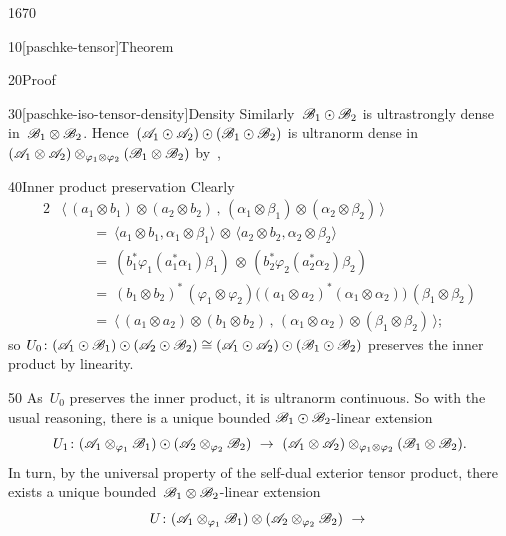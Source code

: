 \begin{parsec}{1670}
\begin{point}{10}[paschke-tensor]{Theorem}
\begin{point}{20}{Proof}
\begin{point}{30}[paschke-iso-tensor-density]{Density}
Similarly~$\mathscr{B}_1 \odot \mathscr{B}_2$
    is ultrastrongly dense in~$\mathscr{B}_1 \otimes \mathscr{B}_2$.
Hence~$(\mathscr{A}_1 \odot \mathscr{A}_2) \odot 
    (\mathscr{B}_1 \odot \mathscr{B}_2)$ is ultranorm dense
    in
    $(\mathscr{A}_1 \otimes \mathscr{A}_2) \otimes_{\varphi_1 \otimes \varphi_2}
    (\mathscr{B}_1 \otimes \mathscr{B}_2)$
        by~,
\end{point}
\begin{point}{40}{Inner product preservation}%
Clearly
\begin{alignat*}{2}
    &
    \bigl\langle\,
    (a_1 \otimes b_1)\otimes (a_2 \otimes b_2)\,,\,
    (\alpha_1 \otimes \beta_1 )\otimes( \alpha_2 \otimes \beta_2)
    \,\bigr\rangle \\
    & \qquad\ = \ 
    \langle a_1 \otimes b_1 , \alpha_1 \otimes \beta_1 \rangle \,\otimes\,
    \langle a_2 \otimes b_2 , \alpha_2 \otimes \beta_2 \rangle \\
    & \qquad\ = \ 
    (b_1^* \varphi_1( a_1^* \alpha_1) \beta_1)
    \,\otimes \,
    (b_2^* \varphi_2( a_2^* \alpha_2) \beta_2) \\
    & \qquad \ = \ 
    (b_1 \otimes b_2)^* \,(\varphi_1 \otimes \varphi_2)
    \bigl((a_1 \otimes a_2)^* (\alpha_1 \otimes \alpha_2)\bigr)
    \,(\beta_1 \otimes \beta_2) \\
    & \qquad \ = \ 
    \bigl\langle\,
    (a_1\otimes a_2)\otimes (b_1 \otimes b_2) \,,\,
    (\alpha_1\otimes \alpha_2)\otimes (\beta_1 \otimes \beta_2)
    \,\bigr\rangle;
\end{alignat*}
so $U_0 \colon (\mathscr{A}_1 \odot \mathscr{B}_1) \odot (\mathscr{A}_2 \odot \mathscr{B}_2) \cong
(\mathscr{A}_1 \odot \mathscr{A}_2) \odot (\mathscr{B}_1 \odot \mathscr{B}_2) $
preserves the inner product by linearity.
\end{point}
\begin{point}{50}%
As~$U_0$ preserves the inner product,
    it is ultranorm continuous.
So with the usual reasoning, there is a unique bounded
    $\mathscr{B}_1 \odot \mathscr{B}_2$-linear extension
\begin{equation*}
    U_1\colon (\scrA_1 \otimes_{\varphi_1} \scrB_1) \odot (\scrA_2 \otimes_{\varphi_2} \scrB_2) \ \to \ 
        (\scrA_1 \otimes \scrA_2) \otimes_{\varphi_1 \otimes \varphi_2} (\scrB_1 \otimes \scrB_2).
\end{equation*}
In turn, by the universal property of the self-dual exterior tensor product,
    there exists a unique
    bounded~$\mathscr{B}_1\otimes \mathscr{B}_2$-linear extension
\begin{equation*}
    U\colon (\scrA_1 \otimes_{\varphi_1} \scrB_1) \otimes (\scrA_2 \otimes_{\varphi_2} \scrB_2) \ \to\ 

\end{equation*}
\end{point}
\end{point}
\end{point}
\end{parsec}
